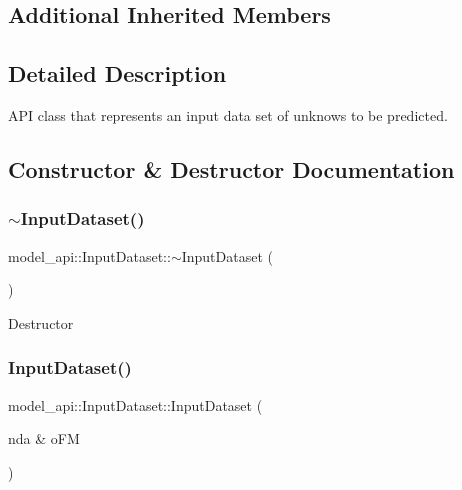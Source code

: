 \subsection*{Additional Inherited Members}


\subsection{Detailed Description}
A\+PI class that represents an input data set of unknows to be predicted. 

\subsection{Constructor \& Destructor Documentation}
\mbox{\label{classmodel__api_1_1InputDataset_a31f12b83db2195f609dfc8af27cdbc58}} 
\subsubsection{\texorpdfstring{$\sim$\+Input\+Dataset()}{~InputDataset()}}
{\footnotesize\ttfamily model\+\_\+api\+::\+Input\+Dataset\+::$\sim$\+Input\+Dataset (\begin{DoxyParamCaption}{ }\end{DoxyParamCaption})}

Destructor \mbox{\label{classmodel__api_1_1InputDataset_a5fd9fc18bbd147d612acb16a808a135c}} 
\subsubsection{\texorpdfstring{Input\+Dataset()}{InputDataset()}\hspace{0.1cm}{\footnotesize\ttfamily [1/3]}}
{\footnotesize\ttfamily model\+\_\+api\+::\+Input\+Dataset\+::\+Input\+Dataset (\begin{DoxyParamCaption}\item[{nda \&}]{o\+FM }\end{DoxyParamCaption})}


